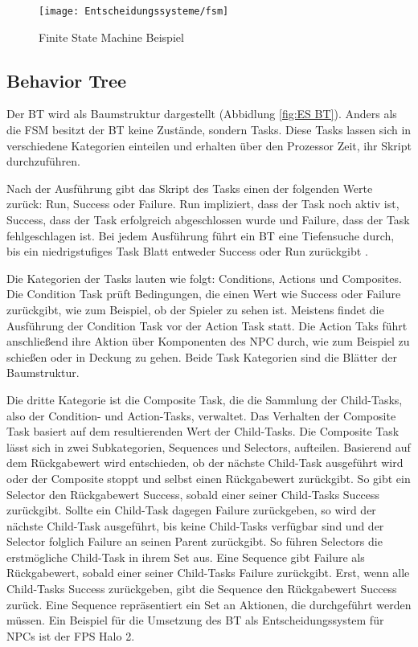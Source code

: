 \begin{figure}[h]
  \centering
  \texttt{[image: Entscheidungssysteme/fsm]}
	\captionsetup{justification=justified, format=plain}
  \caption{Finite State Machine Beispiel}
  \label{fig:ES FSM}
\end{figure}


\subsection{Behavior Tree}
\label{chap:bt}

Der BT wird als Baumstruktur dargestellt (Abbidlung \ref{fig:ES BT}). Anders als die FSM besitzt der BT keine Zust\"{a}nde, sondern Tasks. Diese Tasks lassen sich in verschiedene Kategorien einteilen und erhalten \"{u}ber den Prozessor Zeit, ihr Skript durchzuf\"{u}hren.

Nach der Ausf\"{u}hrung gibt das Skript des Tasks einen der folgenden Werte zur\"{u}ck: Run, Success oder Failure. Run impliziert, dass der Task noch aktiv ist, Success, dass der Task erfolgreich abgeschlossen wurde und Failure, dass der Task fehlgeschlagen ist. Bei jedem Ausf\"{u}hrung f\"{u}hrt ein BT eine Tiefensuche durch, bis ein niedrigstufiges Task Blatt entweder Success oder Run zur\"{u}ckgibt \autocite{qlbt}.

Die Kategorien der Tasks lauten wie folgt: Conditions, Actions und Composites. Die Condition Task pr\"{u}ft Bedingungen, die einen Wert wie Success oder Failure zur\"{u}ckgibt, wie zum Beispiel, ob der Spieler zu sehen ist. Meistens findet die Ausf\"{u}hrung der Condition Task vor der Action Task statt. Die Action Taks f\"{u}hrt anschlie\ss{}end ihre Aktion \"{u}ber Komponenten des NPC durch, wie zum Beispiel zu schie\ss{}en oder in Deckung zu gehen. Beide Task Kategorien sind die Bl\"{a}tter der Baumstruktur.

Die dritte Kategorie ist die Composite Task, die die Sammlung der Child-Tasks, also der Condition- und Action-Tasks, verwaltet. Das Verhalten der Composite Task basiert auf dem resultierenden Wert der Child-Tasks. Die Composite Task l\"{a}sst sich in zwei Subkategorien, Sequences und Selectors, aufteilen. Basierend auf dem R\"{u}ckgabewert wird entschieden, ob der n\"{a}chste Child-Task ausgef\"{u}hrt wird oder der Composite stoppt und selbst einen R\"{u}ckgabewert zur\"{u}ckgibt. So gibt ein Selector den R\"{u}ckgabewert Success, sobald einer seiner Child-Tasks Success zur\"{u}ckgibt. Sollte ein Child-Task dagegen Failure zur\"{u}ckgeben, so wird der n\"{a}chste Child-Task ausgef\"{u}hrt, bis keine Child-Tasks verf\"{u}gbar sind und der Selector folglich Failure an seinen Parent zur\"{u}ckgibt. So f\"{u}hren Selectors die erstm\"{o}gliche Child-Task in ihrem Set aus. Eine Sequence gibt Failure als R\"{u}ckgabewert, sobald einer seiner Child-Tasks Failure zur\"{u}ckgibt. Erst, wenn alle Child-Tasks Success zur\"{u}ckgeben, gibt die Sequence den R\"{u}ckgabewert Success zur\"{u}ck. Eine Sequence repr\"{a}sentiert ein Set an Aktionen, die durchgef\"{u}hrt werden m\"{u}ssen. Ein Beispiel f\"{u}r die Umsetzung des BT als Entscheidungssystem f\"{u}r NPCs ist der FPS Halo 2. \autocite{AIgames, review_game_ai}

